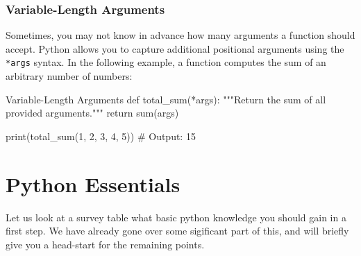 %
\subsubsection{Variable-Length Arguments}
Sometimes, you may not know in advance how many arguments a function should accept. Python allows you to capture additional positional arguments using the \texttt{*args} syntax. In the following example, a function computes the sum of an arbitrary number of numbers:

\begin{codeonly}{Variable-Length Arguments}
def total_sum(*args):
    """Return the sum of all provided arguments."""
    return sum(args)

print(total_sum(1, 2, 3, 4, 5))  # Output: 15
\end{codeonly}


%
\section{Python Essentials}

Let us look at a survey table what basic python knowledge you should gain in a first step. 
We have already gone over some sigificant part of this, and will briefly give you a head-start for
the remaining points. 

